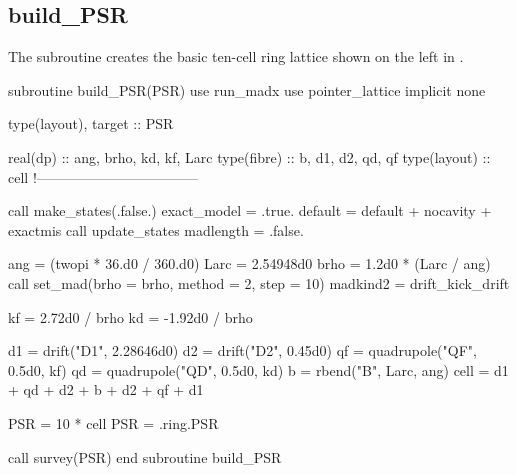 \subsection{build\_PSR}
\label{sec:build.psr}

%
The subroutine  creates the basic ten-cell ring
lattice shown on the left in .

\begin{ptccode}
subroutine  build_PSR(PSR)
use run_madx
use pointer_lattice
implicit none

type(layout), target :: PSR

real(dp) :: ang, brho, kd, kf, Larc
type(fibre) :: b, d1, d2, qd, qf
type(layout) :: cell
!-----------------------------------

call make_states(.false.)       \label{lin:bptc.psrstates}
exact_model = .true.
default = default + nocavity + exactmis
call update_states
madlength = .false.             \label{lin:eptc.psrstates}

ang = (twopi * 36.d0 / 360.d0)
Larc = 2.54948d0
brho = 1.2d0 * (Larc / ang)
call set_mad(brho = brho, method = 2, step = 10) \label{lin:psr.setmad}
madkind2 = drift_kick_drift

kf =  2.72d0 / brho
kd = -1.92d0 / brho

d1 = drift("D1", 2.28646d0)     \label{lin:bptc.psrlatt}
d2 = drift("D2", 0.45d0)
qf = quadrupole("QF", 0.5d0, kf)
qd = quadrupole("QD", 0.5d0, kd)
b  = rbend("B", Larc, ang) \label{lin:psr.bend}
cell = d1 + qd + d2 + b + d2 + qf + d1 \label{lin:eptc.psrlatt}

PSR = 10 * cell
PSR = .ring.PSR                 \label{lin:psr.ring}

call survey(PSR)
end subroutine build_PSR
\end{ptccode}

